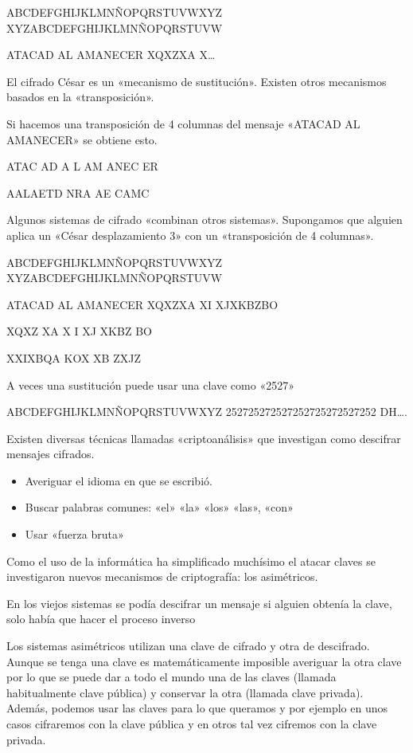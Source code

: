 \documentclass[letterpaper,10pt,spanish]{sphinxmanual}
\begin{document}
ABCDEFGHIJKLMNÑOPQRSTUVWXYZ
XYZABCDEFGHIJKLMNÑOPQRSTUVW

ATACAD AL AMANECER
XQXZXA X…

El cifrado César es un «mecanismo de sustitución». Existen otros mecanismos basados en la «transposición».

Si hacemos una transposición de 4 columnas del mensaje «ATACAD AL AMANECER» se obtiene esto.

ATAC
AD A
L AM
ANEC
ER

AALAETD NRA AE CAMC

Algunos sistemas de cifrado «combinan otros sistemas». Supongamos que alguien aplica un «César desplazamiento 3» con un «transposición de 4 columnas».

ABCDEFGHIJKLMNÑOPQRSTUVWXYZ
XYZABCDEFGHIJKLMNÑOPQRSTUVW

ATACAD AL AMANECER
XQXZXA XI XJXKBZBO

XQXZ
XA X
I XJ
XKBZ
BO

XXIXBQA KOX XB ZXJZ

A veces una sustitución puede usar una clave como «2527»

ABCDEFGHIJKLMNÑOPQRSTUVWXYZ
252725272527252725272527252
DH….

Existen diversas técnicas llamadas «criptoanálisis» que investigan como descifrar mensajes cifrados.
\begin{itemize}
\item {} 
Averiguar el idioma en que se escribió.

\item {} 
Buscar palabras comunes: «el» «la» «los» «las», «con»

\item {} 
Usar «fuerza bruta»

\end{itemize}

Como el uso de la informática ha simplificado muchísimo el atacar claves se investigaron nuevos mecanismos de criptografía: los asimétricos.

En los viejos sistemas se podía descifrar un mensaje si alguien obtenía la clave, solo había que hacer el proceso inverso

Los sistemas asimétricos utilizan una clave de cifrado y otra de descifrado. Aunque se tenga una clave es matemáticamente imposible averiguar la otra clave por lo que se puede dar a todo el mundo una de las claves (llamada habitualmente clave pública) y conservar la otra (llamada clave privada). Además, podemos usar las claves para lo que queramos y por ejemplo en unos casos cifraremos con la clave pública y en otros tal vez cifremos con la clave privada.
\end{document}
